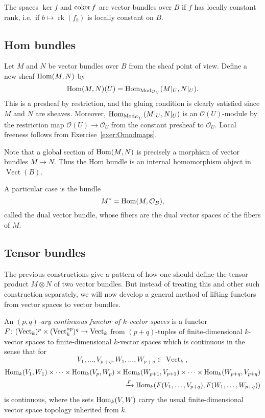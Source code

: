 \documentclass[a4paper,openany]{scrbook}
\DeclareMathOperator{\Vect}{Vect}
\DeclareMathOperator{\rk}{rk}
\begin{document}
\begin{exer}\label{exer:constantrank}
The spaces $\ker f$ and $\operatorname{coker} f$ are vector bundles over $B$ if $f$ has locally constant rank, i.e.\ if $b \mapsto \rk(f_b)$ is locally constant on $B$.
\end{exer}

\subsection{Hom bundles}

Let $M$ and $N$ be vector bundles over $B$ from the sheaf point of view. Define a new sheaf $\operatorname{Hom}(M,N)$ by
\[
\operatorname{Hom}(M,N)(U) = \operatorname{Hom}_{\operatorname{Mod}_{\mathcal O_U}}(M|_U,N|_U).
\]
This is a presheaf by restriction, and the gluing condition is clearly satisfied since $M$ and $N$ are sheaves. Moreover, $\operatorname{Hom}_{\operatorname{Mod}_{\mathcal O_U}}(M|_U,N|_U)$ is an $\mathcal O(U)$-module by the restriction map $\mathcal O(U) \to \mathcal O_U$ from the constant presheaf to $\mathcal O_U$. Local freeness follows from Exercise~\ref{exer:Omodmaps}.

Note that a global section of $\operatorname{Hom}(M,N)$ is precisely a morphism of vector bundles $M \to N$. Thus the Hom bundle is an internal homomorphism object in $\Vect(B)$.

A particular case is the bundle
\[
M^* = \operatorname{Hom}(M,\mathcal O_B),
\]
called the dual vector bundle, whose fibers are the dual vector spaces of the fibers of $M$.

\subsection{Tensor bundles}

The previous constructions give a pattern of how one should define the tensor product $M \otimes N$ of two vector bundles. But instead of treating this and other such construction separately, we will now develop a general method of lifting functors from vector spaces to vector bundles.

\begin{defn}
An \emph{$(p,q)$-ary continuous functor of $k$-vector spaces} is a functor $F\colon (\Vect_k)^p \times (\Vect_k^\op)^q \to \Vect_k$ from $(p+q)$-tuples of finite-dimensional $k$-vector spaces to finite-dimensional $k$-vector spaces which is continuous in the sense that for
\[
V_1,\dots,V_{p+q}, W_1,\dots,W_{p+q} \in \Vect_k,
\]
\begin{align*}
\operatorname{Hom}_k(V_1,W_1) \times \cdots \times \operatorname{Hom}_k(V_{p},W_{p}) \times \operatorname{Hom}_k(W_{p+1},V_{p+1}) \times \cdots \times \operatorname{Hom}_k(W_{p+q},V_{p+q}) \\
\xrightarrow{F} \operatorname{Hom}_k(F(V_1,\dots,V_{p+q}),F(W_1,\dots,W_{p+q}))
\end{align*}
is continuous, where the sets $\operatorname{Hom}_k(V,W)$ carry the usual finite-dimensional vector space topology inherited from $k$.
\end{defn} 
\end{document}
